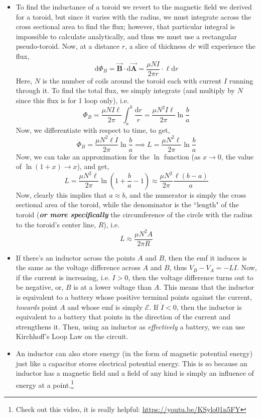 \documentclass{scrartcl}
\begin{document}
    \begin{itemize}
        \item To find the inductance of a toroid we revert to the magnetic field we derived for a toroid, but since it varies with the radius, we must integrate across the cross sectional area to find the flux; however, that particular integral is impossible to calculate analytically, and thus we must use a rectangular pseudo-toroid. Now, at a distance $r$, a slice of thickness $\mathrm dr$ will experience the flux, \[\mathrm d\Phi_B=\vec{\mathbf B}\cdot\mathrm d\vec{\mathbf A}=\frac{\mu NI}{2\pi r}\cdot \ell\mathrm dr\] Here, $N$ is the number of coils around the toroid each with current $I$ running through it. To find the total flux, we simply integrate (and multiply by $N$ since this flux is for 1 loop only), i.e. \[\Phi_B=\frac{\mu NI\ell}{2\pi}\int_a^b\frac{\mathrm dr}r=\frac{\mu N^2I\ell}{2\pi}\ln\frac ba\] Now, we differentiate with respect to time, to get, \[\dot\Phi_B=\frac{\mu N^2\ell\dot I}{2\pi}\ln\frac ba\implies L=\frac{\mu N^2\ell}{2\pi}\ln\frac ba\] Now, we can take an approximation for the $\ln$ function (as $x\to0$, the value of $\ln(1+x)\to x$), and get, \[L=\frac{\mu N^2\ell}{2\pi}\ln\left(1+\frac ba-1\right)\approx\frac{\mu N^2}{2\pi}\frac {\ell\left(b-a\right)}a\] Now, clearly this implies that $a\approx b$, and the numerator is simply the cross sectional area of the toroid, while the denominator is the ``length" of the toroid (\textit{\textbf{or more specifically}} the circumference of the circle with the radius to the toroid's center line, $R$), i.e. \[\boxed{L\approx\frac{\mu N^2A}{2\pi R}}\]
        \item If there's an inductor across the points $A$ and $B$, then the emf it induces is the same as the voltage difference across $A$ and $B$, thus $V_B-V_A=-L\dot I$. Now, if the current is increasing, i.e. $\dot I>0$, then the voltage difference turns out to be negative, or, $B$ is at a lower voltage than $A$. This means that the inductor is equivalent to a battery whose positive terminal points against the current, \textit{towards} point $A$ and whose emf is simply $\mathcal E$. If $\dot I<0$, then the inductor is equivalent to a battery that points in the direction of the current and strengthens it. Then, using an inductor as \textit{effectively} a battery, we can use Kirchhoff's Loop Law on the circuit.
        \item An inductor can also store energy (in the form of magnetic potential energy) just like a capacitor stores electrical potential energy. This is so because an inductor has a magnetic field and a field of any kind is simply an influence of energy at a point.\footnote[3]{Check out this video, it is really helpful: \url{https://youtu.be/KSylo01n5FY}}

\end{itemize}
\end{document}
